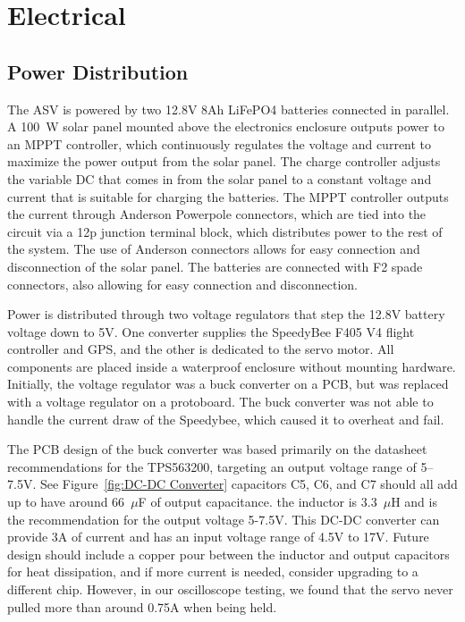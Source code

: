 \section{Electrical}

\subsection{Power Distribution}
The ASV is powered by two 12.8V 8Ah LiFePO4 batteries connected in parallel. A \SI{100}{\watt} solar panel mounted above the electronics enclosure outputs power to an MPPT controller, which continuously regulates the voltage and current to maximize the power output from the solar panel. The charge controller adjusts the variable DC that comes in from the solar panel to a constant voltage and current that is suitable for charging the batteries. The MPPT controller outputs the current through Anderson Powerpole connectors, which are tied into the circuit via a 12p junction terminal block, which distributes power to the rest of the system. The use of Anderson connectors allows for easy connection and disconnection of the solar panel. The batteries are connected with F2 spade connectors, also allowing for easy connection and disconnection.

Power is distributed through two voltage regulators that step the 12.8V battery voltage down to 5V. One converter supplies the SpeedyBee F405 V4 flight controller and GPS, and the other is dedicated to the servo motor. All components are placed inside a waterproof enclosure without mounting hardware. Initially, the voltage regulator was a buck converter on a PCB, but was replaced with a voltage regulator on a protoboard. The buck converter was not able to handle the current draw of the Speedybee, which caused it to overheat and fail. 

The PCB design of the buck converter was based primarily on the datasheet recommendations for the TPS563200, targeting an output voltage range of 5–7.5V. See Figure~\ref{fig:DC-DC Converter} capacitors C5, C6, and C7 should all add up to have around 66~\(\mu\)F of output capacitance. the inductor is 3.3~\(\mu\)H and is the recommendation for the output voltage 5-7.5V. This DC-DC converter can provide 3A of current and has an input voltage range of 4.5V to 17V. Future design should include a copper pour between the inductor and output capacitors for heat dissipation, and if more current is needed, consider upgrading to a different chip. However, in our oscilloscope testing, we found that the servo never pulled more than around 0.75A when being held. 

